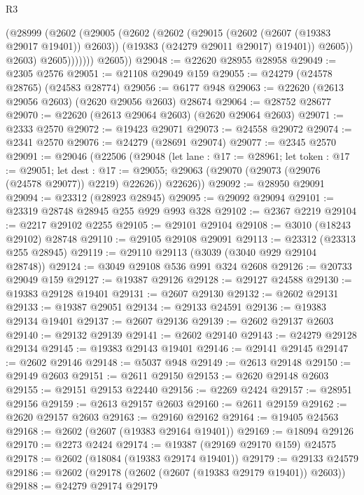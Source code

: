 \begin{lexlean}{R3}
\begin{coremodule}
                    (@28999
                      (@2602
                        (@29005
                          (@2602
                            (@2602
                              (@29015 (@2602 (@2607 (@19383 @29017 @19401)) @2603))
                              (@19383 (@24279 @29011 @29017) @19401))
                            @2605))
                        @2603)
                      @2605)))))))
        @2605))
@29048 := @22620 @28955 @28958
@29049 := @2305 @2576
@29051 := @21108 @29049 @159
@29055 := @24279 (@24578 @28765) (@24583 @28774)
@29056 := @6177 @948
@29063 := @22620 (@2613 @29056 @2603) (@2620 @29056 @2603) @28674
@29064 := @28752 @28677
@29070 := @22620 (@2613 @29064 @2603) (@2620 @29064 @2603)
@29071 := @2333 @2570
@29072 := @19423 @29071
@29073 := @24558 @29072
@29074 := @2341 @2570
@29076 := @24279 (@28691 @29074)
@29077 := @2345 @2570
@29091 := @29046
    (@22506
      (@29048
        (let lane : @17 := @28961;
        let token : @17 := @29051;
        let dest : @17 := @29055; @29063 (@29070 (@29073 (@29076 (@24578 @29077)) @2219) @22626))
        @22626))
@29092 := @28950 @29091
@29094 := @23312 (@28923 @28945)
@29095 := @29092 @29094
@29101 := @23319 @28748 @28945 @255 @929 @993 @328
@29102 := @2367 @2219
@29104 := @2217 @29102 @2255
@29105 := @29101 @29104
@29108 := @3010 (@18243 @29102) @28748
@29110 := @29105 @29108 @29091
@29113 := @23312 (@23313 @255 @28945)
@29119 := @29110 @29113 (@3039 (@3040 @929 @29104 @28748))
@29124 := @3049 @29108 @536 @991 @324 @2608
@29126 := @20733 @29049 @159
@29127 := @19387 @29126
@29128 := @29127 @24588
@29130 := @19383 @29128 @19401
@29131 := @2607 @29130
@29132 := @2602 @29131
@29133 := @19387 @29051
@29134 := @29133 @24591
@29136 := @19383 @29134 @19401
@29137 := @2607 @29136
@29139 := @2602 @29137 @2603
@29140 := @29132 @29139
@29141 := @2602 @29140
@29143 := @24279 @29128 @29134
@29145 := @19383 @29143 @19401
@29146 := @29141 @29145
@29147 := @2602 @29146
@29148 := @5037 @948
@29149 := @2613 @29148
@29150 := @29149 @2603
@29151 := @2611 @29150
@29153 := @2620 @29148 @2603
@29155 := @29151 @29153 @22440
@29156 := @2269 @2424
@29157 := @28951 @29156
@29159 := @2613 @29157 @2603
@29160 := @2611 @29159
@29162 := @2620 @29157 @2603
@29163 := @29160 @29162
@29164 := @19405 @24563
@29168 := @2602 (@2607 (@19383 @29164 @19401))
@29169 := @18094 @29126
@29170 := @2273 @2424
@29174 := @19387 (@29169 @29170 @159) @24575
@29178 := @2602 (@18084 (@19383 @29174 @19401))
@29179 := @29133 @24579
@29186 := @2602 (@29178 (@2602 (@2607 (@19383 @29179 @19401)) @2603))
@29188 := @24279 @29174 @29179

\end{coremodule}
\end{lexlean}
